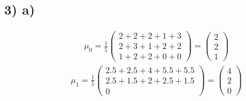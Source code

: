 \subsection*{3) a)}
\begin{align*}
  \mu_0 = \frac{1}{5} \begin{pmatrix} 2 +2 +2 +1 +3 \\ 2 +3 +1 +2 +2 \\ 1 +2 +2 +0 +0 \end{pmatrix} = \begin{pmatrix}2 \\ 2 \\ 1 \end{pmatrix}
\end{align*}
\begin{align*}
  \mu_1 = \frac{1}{5} \begin{pmatrix} 2.5 +2.5 +4 +5.5 +5.5 \\ 2.5 +1.5 +2 +2.5 +1.5 \\ 0 \end{pmatrix} = \begin{pmatrix} 4 \\ 2 \\ 0 \end{pmatrix}
\end{align*}

